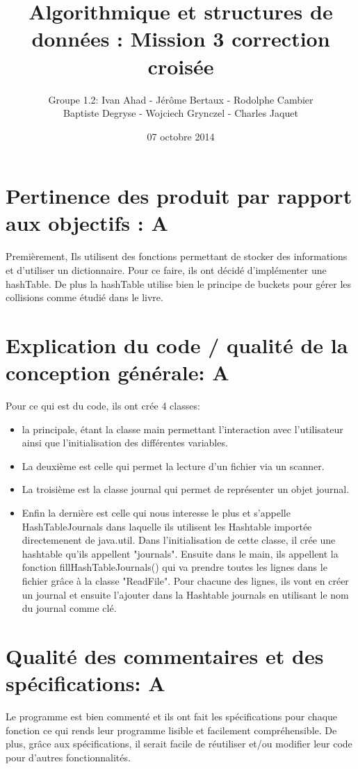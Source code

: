 \documentclass[a4paper]{article}
\title{Algorithmique et structures de données : Mission 3 correction croisée}
\date{07 octobre 2014}
\author{Groupe 1.2: Ivan Ahad - Jérôme Bertaux - Rodolphe Cambier \\ 
	Baptiste Degryse - Wojciech Grynczel - Charles Jaquet}
\begin{document}
\maketitle

\section*{Pertinence des produit par rapport aux objectifs : A}
Premièrement, Ils utilisent des fonctions permettant de stocker des informations et d'utiliser un dictionnaire. Pour ce faire, ils ont décidé d'implémenter une hashTable.
De plus la hashTable utilise bien le principe de buckets pour gérer les collisions comme étudié dans le livre.

\section*{Explication du code / qualité de la conception générale: A}
Pour ce qui est du code, ils ont crée 4 classes:
\begin{itemize}

\item la principale, étant la classe main permettant l'interaction avec l'utilisateur ainsi que l'initialisation des différentes variables.
\item La deuxième est celle qui permet la lecture d'un fichier via un scanner.
\item La troisième est la classe journal qui permet de représenter un objet journal. 
\item Enfin la dernière est celle qui nous interesse le plus et s'appelle HashTableJournals dans laquelle ils utilisent les Hashtable importée directemenent de java.util.
Dans l'initialisation de cette classe, il crée une hashtable qu'ils appellent "journals". Ensuite dans le main, ils appellent la fonction fillHashTableJournals() qui va prendre toutes les lignes dans le fichier grâce à la classe "ReadFile". Pour chacune des lignes, ils vont en créer un journal et ensuite l'ajouter dans la Hashtable journals en utilisant le nom du journal comme clé.
\end{itemize}

\section*{Qualité des commentaires et des spécifications: A}
Le programme est bien commenté et ils ont fait les spécifications pour chaque fonction ce qui rends leur programme lisible et facilement compréhensible. De plus, grâce aux spécifications, il serait facile de réutiliser et/ou modifier leur code pour d'autres fonctionnalités.
\end{document}

